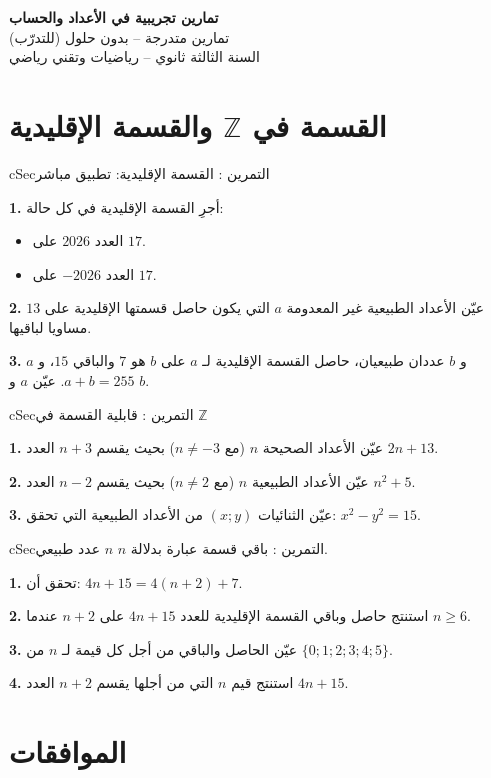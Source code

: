 \documentclass[12pt,a4paper]{article}
\newenvironment{BOX}[2]{\begin{otherlanguage}{english}\begin{arbox}{#1}{#2}}{\end{arbox}\end{otherlanguage}}
\newcounter{exo}
\newenvironment{tamrin}[1]{\stepcounter{exo}\begin{BOX}{cSec}{التمرين \theexo: #1}}{\end{BOX}}
\newenvironment{LTR}{\begin{otherlanguage}{english}}{\end{otherlanguage}}
\newcommand{\Z}{\mathbb{Z}}
\newenvironment{sq}{\begin{itemize}[leftmargin=2.4em,itemsep=3pt]}{\end{itemize}}
\newcommand{\qa}{\item[(أ)]}\newcommand{\qb}{\item[(ب)]}\newcommand{\qc}{\item[(جـ)]}\newcommand{\qd}{\item[(د)]}\newcommand{\qe}{\item[(هـ)]}
\newcommand{\QQ}[1]{\par\smallskip\textbf{#1.} }
\begin{document}
\begin{LTR}
\begin{tcolorbox}[enhanced,colback=cSec,colframe=cSec,arc=3mm,halign=center,boxrule=0pt,top=12pt,bottom=12pt,before upper={\selectlanguage{arabic}}]
{\color{white}\fontsize{26}{32}\selectfont\bfseries تمارين تجريبية في الأعداد والحساب}\\[8pt]
{\color{white}\large تمارين متدرجة -- بدون حلول (للتدرّب)}\\[5pt]
{\color{white}\large السنة الثالثة ثانوي -- رياضيات وتقني رياضي}
\end{tcolorbox}
\end{LTR}
\section{القسمة في $\Z$ والقسمة الإقليدية}

\begin{tamrin}{القسمة الإقليدية: تطبيق مباشر}
\QQ{1} أجرِ القسمة الإقليدية في كل حالة:
\begin{sq}
\qa العدد $2026$ على $17$.
\qb العدد $-2026$ على $17$.
\end{sq}
\QQ{2} عيّن الأعداد الطبيعية غير المعدومة $a$ التي يكون حاصل قسمتها الإقليدية على $13$ مساويا لباقيها.
\QQ{3} $a$ و $b$ عددان طبيعيان، حاصل القسمة الإقليدية لـ $a$ على $b$ هو $7$ والباقي $15$، و $a+b=255$. عيّن $a$ و $b$.
\end{tamrin}

\begin{tamrin}{قابلية القسمة في $\Z$}
\QQ{1} عيّن الأعداد الصحيحة $n$ (مع $n\neq -3$) بحيث يقسم $n+3$ العدد $2n+13$.
\QQ{2} عيّن الأعداد الطبيعية $n$ (مع $n\neq 2$) بحيث يقسم $n-2$ العدد $n^2+5$.
\QQ{3} عيّن الثنائيات $(x;y)$ من الأعداد الطبيعية التي تحقق: $x^2-y^2=15$.
\end{tamrin}

\begin{tamrin}{باقي قسمة عبارة بدلالة $n$}
$n$ عدد طبيعي.
\QQ{1} تحقق أن: $4n+15=4(n+2)+7$.
\QQ{2} استنتج حاصل وباقي القسمة الإقليدية للعدد $4n+15$ على $n+2$ عندما $n\ge 6$.
\QQ{3} عيّن الحاصل والباقي من أجل كل قيمة لـ $n$ من $\{0;1;2;3;4;5\}$.
\QQ{4} استنتج قيم $n$ التي من أجلها يقسم $n+2$ العدد $4n+15$.
\end{tamrin}

\section{الموافقات}
\end{document}
